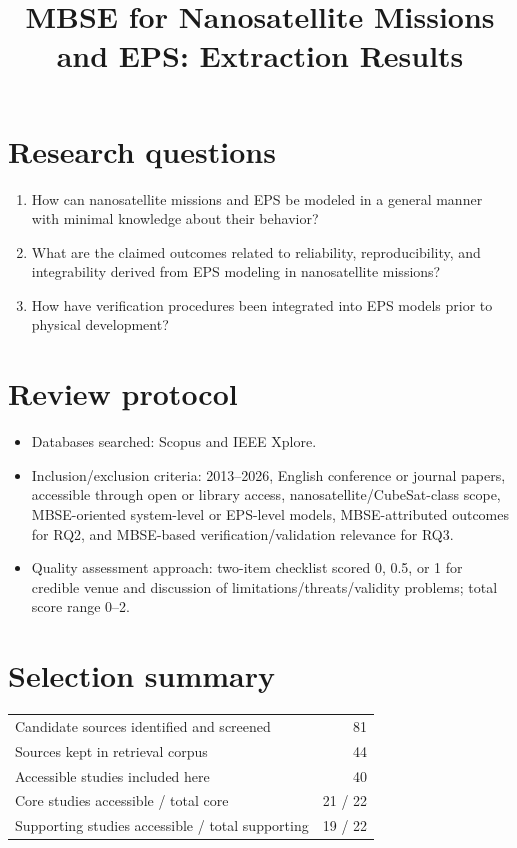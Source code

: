 \documentclass[10pt]{article}
\title{MBSE for Nanosatellite Missions and EPS: Extraction Results}
\author{}
\date{}
\begin{document}
\maketitle
\vspace{-8mm}

\section*{Research questions}
\begin{enumerate}[label=RQ\arabic*.]
\item How can nanosatellite missions and EPS be modeled in a general manner with minimal knowledge about their behavior?
\item What are the claimed outcomes related to reliability, reproducibility, and integrability derived from EPS modeling in nanosatellite missions?
\item How have verification procedures been integrated into EPS models prior to physical development?
\end{enumerate}

\section*{Review protocol}
\begin{itemize}
\item Databases searched: Scopus and IEEE Xplore.
\item Inclusion/exclusion criteria: 2013--2026, English conference or journal papers, accessible through open or library access, nanosatellite/CubeSat-class scope, MBSE-oriented system-level or EPS-level models, MBSE-attributed outcomes for RQ2, and MBSE-based verification/validation relevance for RQ3.
\item Quality assessment approach: two-item checklist scored 0, 0.5, or 1 for credible venue and discussion of limitations/threats/validity problems; total score range 0--2.
\end{itemize}

\section*{Selection summary}
\begin{center}
\begin{tabular}{lr}
\toprule
Candidate sources identified and screened & 81\\
Sources kept in retrieval corpus & 44\\
Accessible studies included here & 40\\
Core studies accessible / total core & 21 / 22\\
Supporting studies accessible / total supporting & 19 / 22\\
\bottomrule
\end{tabular}
\end{center}
\end{document}
